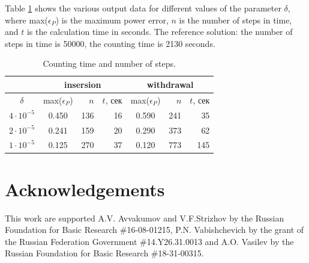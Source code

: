 \documentclass[runningheads]{llncs}
\begin{document}
Table \ref{t-2} shows the various output data for different values of the parameter $\delta$, where max($\epsilon_P$) is the maximum power error, $n$ is the number of steps in time, and $t$ is the calculation time in seconds.
The reference solution: the number of steps in time is 50000, the counting time is 2130 seconds.
\begin{table}[ht]
\caption{Counting time and number of steps.}
\label{t-2}
\begin{center}
\begin{tabular}{ccrrcrr}
&\multicolumn{3}{c}{insersion} & \multicolumn{3}{c}{withdrawal}\\
\hline
$\delta$ & max($\epsilon_P$) & $n$ & $t$, сек & max($\epsilon_P$)  & $n$ & $t$, сек \\
\hline
$4\cdot 10^{-5}$ & 0.450 & 136 & 16 & 0.590 & 241 & 35 \\
$2\cdot 10^{-5}$ & 0.241 & 159 & 20 & 0.290 & 373 & 62 \\
$1\cdot 10^{-5}$ & 0.125 & 270 & 37 & 0.120 & 773 & 145 \\
\hline
\end{tabular}
\end{center}
\end{table}

\section*{Acknowledgements}
This work are supported A.V. Avvakumov and V.F.Strizhov by the Russian Foundation for Basic Research \#16-08-01215, P.N. Vabishchevich by the grant of the Russian Federation Government \#14.Y26.31.0013 and A.O. Vasilev by the Russian Foundation for Basic Research \#18-31-00315.
\end{document}
